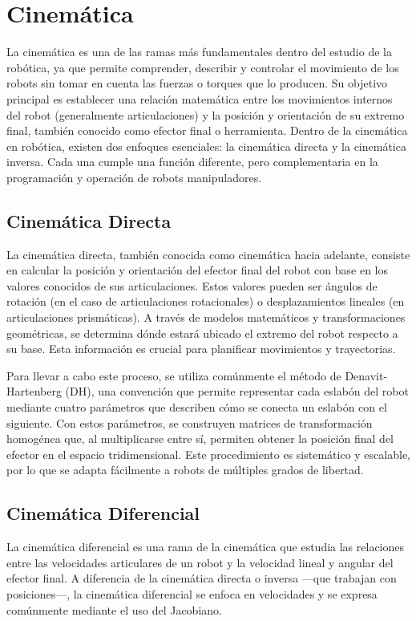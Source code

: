 \section{Cinemática} \label{sec:cinematica}

La cinemática es una de las ramas más fundamentales dentro del estudio de la robótica, ya que permite comprender, describir y controlar el movimiento de los robots sin tomar en cuenta las fuerzas o torques que lo producen. Su objetivo principal es establecer una relación matemática entre los movimientos internos del robot (generalmente articulaciones) y la posición y orientación de su extremo final, también conocido como efector final o herramienta.
Dentro de la cinemática en robótica, existen dos enfoques esenciales: la cinemática directa y la cinemática inversa. Cada una cumple una función diferente, pero complementaria en la programación y operación de robots manipuladores.
\cite{fundamentosRobotica}
\cite{introduccionRobotica}

\subsection{Cinemática Directa}
La cinemática directa, también conocida como cinemática hacia adelante, consiste en calcular la posición y orientación del efector final del robot con base en los valores conocidos de sus articulaciones. Estos valores pueden ser ángulos de rotación (en el caso de articulaciones rotacionales) o desplazamientos lineales (en articulaciones prismáticas). A través de modelos matemáticos y transformaciones geométricas, se determina dónde estará ubicado el extremo del robot respecto a su base. Esta información es crucial para planificar movimientos y trayectorias.


Para llevar a cabo este proceso, se utiliza comúnmente el método de Denavit-Hartenberg (DH), una convención que permite representar cada eslabón del robot mediante cuatro parámetros que describen cómo se conecta un eslabón con el siguiente. Con estos parámetros, se construyen matrices de transformación homogénea que, al multiplicarse entre sí, permiten obtener la posición final del efector en el espacio tridimensional. Este procedimiento es sistemático y escalable, por lo que se adapta fácilmente a robots de múltiples grados de libertad.

\subsection{Cinemática Diferencial}
La cinemática diferencial es una rama de la cinemática que estudia las relaciones entre las velocidades articulares de un robot y la velocidad lineal y angular del efector final. A diferencia de la cinemática directa o inversa —que trabajan con posiciones—, la cinemática diferencial se enfoca en velocidades y se expresa comúnmente mediante el uso del Jacobiano.

